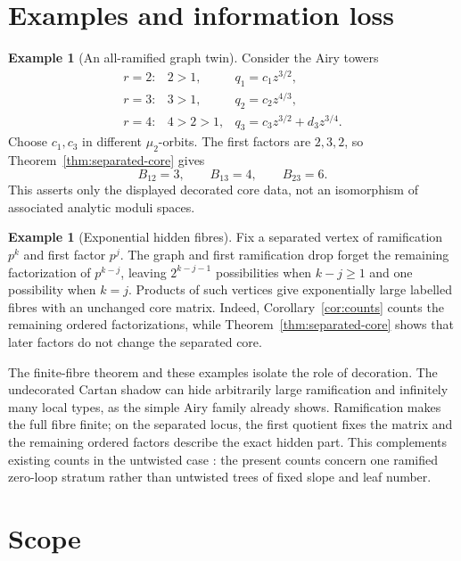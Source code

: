 \documentclass[11pt,a4paper]{amsart}
\theoremstyle{plain}
\theoremstyle{definition}
\newtheorem{example}[theorem]{Example}
\begin{document}
\section{Examples and information loss}\label{sec:examples}

\begin{example}[An all-ramified graph twin]\label{ex:twin}
Consider the Airy towers
\[
\begin{array}{ccl}
 r=2:&2>1,&q_1=c_1z^{3/2},\\
 r=3:&3>1,&q_2=c_2z^{4/3},\\
 r=4:&4>2>1,&q_3=c_3z^{3/2}+d_3z^{3/4}.
\end{array}
\]
Choose $c_1,c_3$ in different $\mu_2$-orbits.  The first factors are $2,3,2$, so
Theorem~\ref{thm:separated-core} gives
\[
 B_{12}=3,\qquad B_{13}=4,\qquad B_{23}=6.
\]
This asserts only the displayed decorated core data, not an isomorphism of associated analytic
moduli spaces.
\end{example}

\begin{example}[Exponential hidden fibres]
Fix a separated vertex of ramification $p^k$ and first factor $p^j$.  The graph and first
ramification drop forget the remaining factorization of $p^{k-j}$, leaving
$2^{k-j-1}$ possibilities when $k-j\ge1$ and one possibility when $k=j$.  Products of such
vertices give exponentially large labelled fibres with an unchanged core matrix.  Indeed,
Corollary~\ref{cor:counts} counts the remaining ordered factorizations, while
Theorem~\ref{thm:separated-core} shows that later factors do not change the separated core.
\end{example}

The finite-fibre theorem and these examples isolate the role of decoration.  The undecorated Cartan
shadow can hide arbitrarily large ramification and infinitely many local types, as the simple Airy
family already shows.  Ramification makes
the full fibre finite; on the separated locus, the first quotient fixes the matrix and the remaining
ordered factors describe the exact hidden part.  This complements existing counts in the untwisted
case \cite{Boalch2025Counting}: the present counts concern one ramified zero-loop stratum rather
than untwisted trees of fixed slope and leaf number.

\section{Scope}\label{sec:scope}
\end{document}
